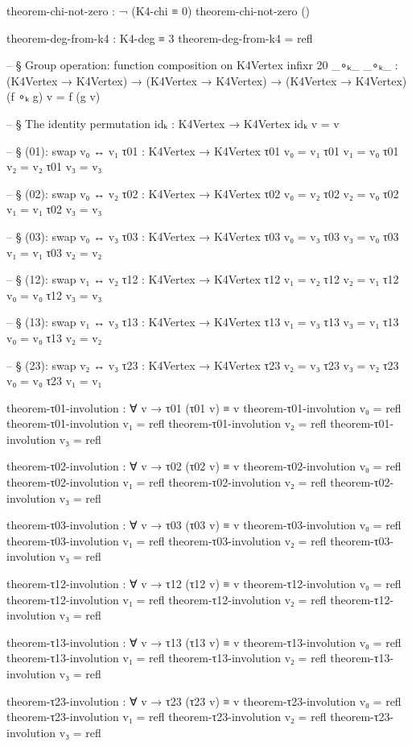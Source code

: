 \documentclass[11pt,a4paper]{book}
\begin{document}
\begin{code}
theorem-chi-not-zero : ¬ (K4-chi ≡ 0)
theorem-chi-not-zero ()

theorem-deg-from-k4 : K4-deg ≡ 3
theorem-deg-from-k4 = refl

-- § Group operation: function composition on K4Vertex
infixr 20 _∘ₖ_
_∘ₖ_ : (K4Vertex → K4Vertex) → (K4Vertex → K4Vertex) → (K4Vertex → K4Vertex)
(f ∘ₖ g) v = f (g v)

-- § The identity permutation
idₖ : K4Vertex → K4Vertex
idₖ v = v

-- § (01): swap v₀ ↔ v₁
τ01 : K4Vertex → K4Vertex
τ01 v₀ = v₁
τ01 v₁ = v₀
τ01 v₂ = v₂
τ01 v₃ = v₃

-- § (02): swap v₀ ↔ v₂
τ02 : K4Vertex → K4Vertex
τ02 v₀ = v₂
τ02 v₂ = v₀
τ02 v₁ = v₁
τ02 v₃ = v₃

-- § (03): swap v₀ ↔ v₃
τ03 : K4Vertex → K4Vertex
τ03 v₀ = v₃
τ03 v₃ = v₀
τ03 v₁ = v₁
τ03 v₂ = v₂

-- § (12): swap v₁ ↔ v₂
τ12 : K4Vertex → K4Vertex
τ12 v₁ = v₂
τ12 v₂ = v₁
τ12 v₀ = v₀
τ12 v₃ = v₃

-- § (13): swap v₁ ↔ v₃
τ13 : K4Vertex → K4Vertex
τ13 v₁ = v₃
τ13 v₃ = v₁
τ13 v₀ = v₀
τ13 v₂ = v₂

-- § (23): swap v₂ ↔ v₃
τ23 : K4Vertex → K4Vertex
τ23 v₂ = v₃
τ23 v₃ = v₂
τ23 v₀ = v₀
τ23 v₁ = v₁

theorem-τ01-involution : ∀ v → τ01 (τ01 v) ≡ v
theorem-τ01-involution v₀ = refl
theorem-τ01-involution v₁ = refl
theorem-τ01-involution v₂ = refl
theorem-τ01-involution v₃ = refl

theorem-τ02-involution : ∀ v → τ02 (τ02 v) ≡ v
theorem-τ02-involution v₀ = refl
theorem-τ02-involution v₁ = refl
theorem-τ02-involution v₂ = refl
theorem-τ02-involution v₃ = refl

theorem-τ03-involution : ∀ v → τ03 (τ03 v) ≡ v
theorem-τ03-involution v₀ = refl
theorem-τ03-involution v₁ = refl
theorem-τ03-involution v₂ = refl
theorem-τ03-involution v₃ = refl

theorem-τ12-involution : ∀ v → τ12 (τ12 v) ≡ v
theorem-τ12-involution v₀ = refl
theorem-τ12-involution v₁ = refl
theorem-τ12-involution v₂ = refl
theorem-τ12-involution v₃ = refl

theorem-τ13-involution : ∀ v → τ13 (τ13 v) ≡ v
theorem-τ13-involution v₀ = refl
theorem-τ13-involution v₁ = refl
theorem-τ13-involution v₂ = refl
theorem-τ13-involution v₃ = refl

theorem-τ23-involution : ∀ v → τ23 (τ23 v) ≡ v
theorem-τ23-involution v₀ = refl
theorem-τ23-involution v₁ = refl
theorem-τ23-involution v₂ = refl
theorem-τ23-involution v₃ = refl


\end{code}
\end{document}
